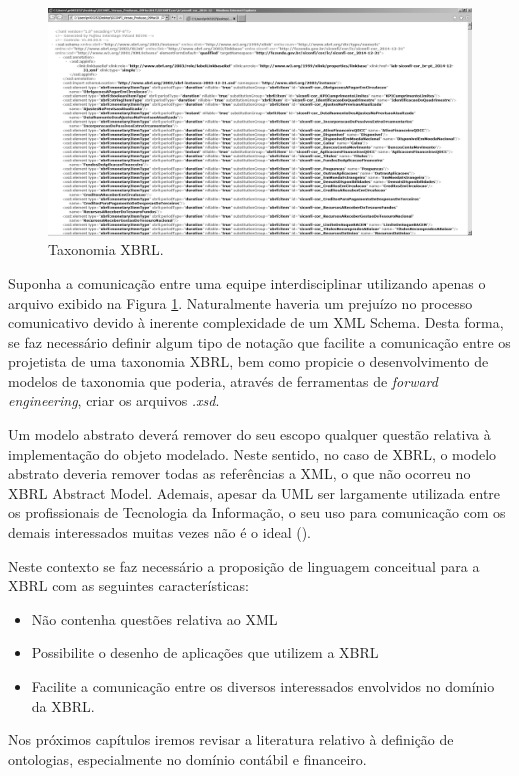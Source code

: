 \documentclass[msc,proposal,hidelot,hideabstract]{ppgccufmg} %
\begin{document}
\begin{figure}[hbtp]
\centering
\includegraphics[width=.75\textwidth]{../img/arquivo_xsd.png}
\caption{Taxonomia XBRL.}
\label{fig:arquivo_xsd}
\end{figure}

Suponha a comunicação entre uma equipe interdisciplinar utilizando apenas o arquivo exibido na Figura \ref{fig:arquivo_xsd}. Naturalmente haveria um prejuízo no processo comunicativo devido à inerente complexidade de um XML Schema. Desta forma, se faz necessário definir algum tipo de notação que facilite a comunicação entre os projetista de uma taxonomia XBRL, bem como propicie o desenvolvimento de modelos de taxonomia que poderia, através de ferramentas de \textit{forward engineering}, criar os arquivos \textit{.xsd}{}.

Um modelo abstrato deverá remover do seu escopo qualquer questão relativa à implementação do objeto modelado. Neste sentido, no caso de XBRL, o modelo abstrato deveria remover todas as referências a XML, o que não ocorreu no XBRL Abstract Model. Ademais, apesar da UML ser largamente utilizada entre os profissionais de Tecnologia da Informação, o seu uso para comunicação com os demais interessados muitas vezes não é o ideal (\cite{peixoto2008comparison}).

Neste contexto se faz necessário a proposição de linguagem conceitual para a XBRL com as seguintes características:
 \begin{itemize}
    \item Não contenha questões relativa ao XML
    \item Possibilite o desenho de aplicações que utilizem a XBRL
    \item Facilite a comunicação entre os diversos interessados envolvidos no domínio da XBRL.
 \end{itemize}

Nos próximos capítulos iremos revisar a literatura relativo à definição de ontologias, especialmente no domínio contábil e financeiro.
\end{document}
